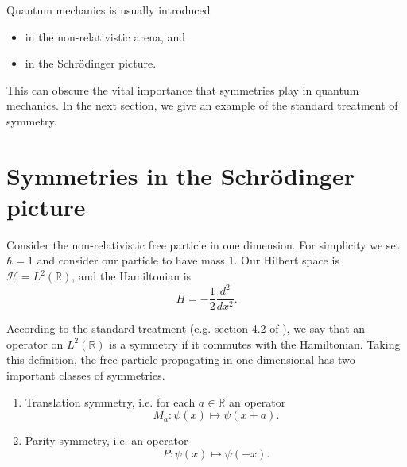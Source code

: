 \documentclass[a4paper,10pt]{scrreprt}
\newcommand{\tder}[2]{\frac{d #1}{d #2}}
\newcommand{\R}{\mathbb{R}}
\theoremstyle{definition}
\theoremstyle{plain}
\theoremstyle{remark}
\begin{document}

Quantum mechanics is usually introduced 
\begin{itemize}
  \item in the non-relativistic arena, and

  \item in the Schr\"{o}dinger picture.
\end{itemize}
This can obscure the vital importance that symmetries play in quantum mechanics. In the next section, we give an example of the standard treatment of symmetry. 
\section{Symmetries in the Schr\"{o}dinger picture} \label{sec:symmetriesinqm}

Consider the non-relativistic free particle in one dimension. For simplicity we set $\hbar = 1$ and consider our particle to have mass $1$. Our Hilbert space is $\mathscr{H} = L^{2}(\R)$, and the Hamiltonian is
\begin{equation*}
  H = -\frac{1}{2} \tder{^{2}}{x^{2}}.
\end{equation*}

According to the standard treatment (e.g. section 4.2 of \cite{binneyphysicsofqm}), we say that an operator on $L^{2}(\R)$ is a symmetry if it commutes with the Hamiltonian. Taking this definition, the free particle propagating in one-dimensional has two important classes of symmetries.
\begin{enumerate}
  \item Translation symmetry, i.e. for each $a \in \R$ an operator 
    \begin{equation*}
      M_{a}\colon \psi(x) \mapsto \psi(x + a).
    \end{equation*}

  \item Parity symmetry, i.e. an operator 
    \begin{equation*}
      P\colon \psi(x) \mapsto \psi(-x).
    \end{equation*}
\end{enumerate}
\end{document}
